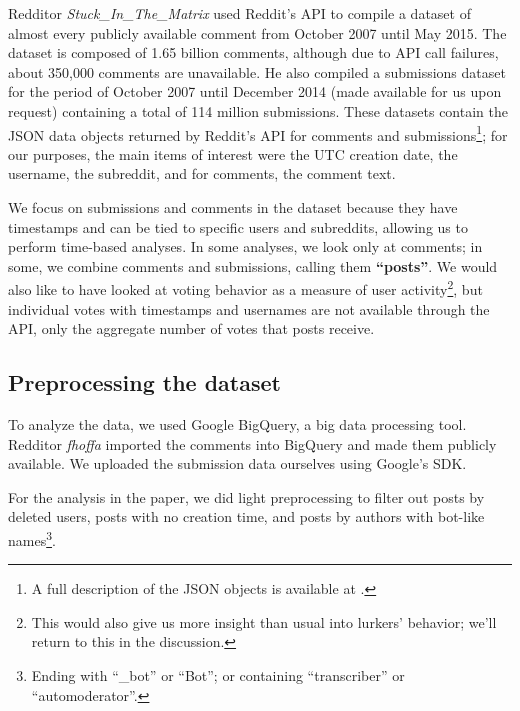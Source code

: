Redditor \textit{Stuck\_In\_The\_Matrix} used Reddit's API to compile a dataset of almost every publicly available comment\cite{RedditDataset1} from October 2007 until May 2015.  The dataset is composed of 1.65 billion comments, although due to API call failures, about 350,000 comments are unavailable.  He also compiled a submissions dataset for the period of October 2007 until December 2014 (made available for us upon request) containing a total of 114 million submissions.  These datasets contain the JSON data objects returned by Reddit's API for comments and submissions\footnote{A full description of the JSON objects is available at \cite{RedditAPI}.}; for our purposes, the main items of interest were the UTC creation date, the username, the subreddit, and for comments, the comment text.

We focus on submissions and comments in the dataset because they have timestamps and can be tied to specific users and subreddits, allowing us to perform time-based analyses.   In some analyses, we look only at comments; in some, we combine comments and submissions, calling them \textbf{``posts''}.  We would also like to have looked at voting behavior as a measure of user activity\footnote{This would also give us more insight than usual into lurkers' behavior; we'll return to this in the discussion.}, but individual votes with timestamps and usernames are not available through the API, only the aggregate number of votes that posts receive.

\subsection{Preprocessing the dataset}

To analyze the data, we used Google BigQuery\cite{BigQuery}, a big data processing tool.
Redditor \textit{fhoffa} imported the comments into BigQuery and made them publicly available\cite{RedditDataset2}.  We uploaded the submission data ourselves using Google's SDK.

For the analysis in the paper, we did light preprocessing to filter out posts by deleted users, posts with no creation time, and posts by authors with bot-like names\footnote{Ending with ``\_bot'' or ``Bot''; or containing ``transcriber'' or ``automoderator''.}.

